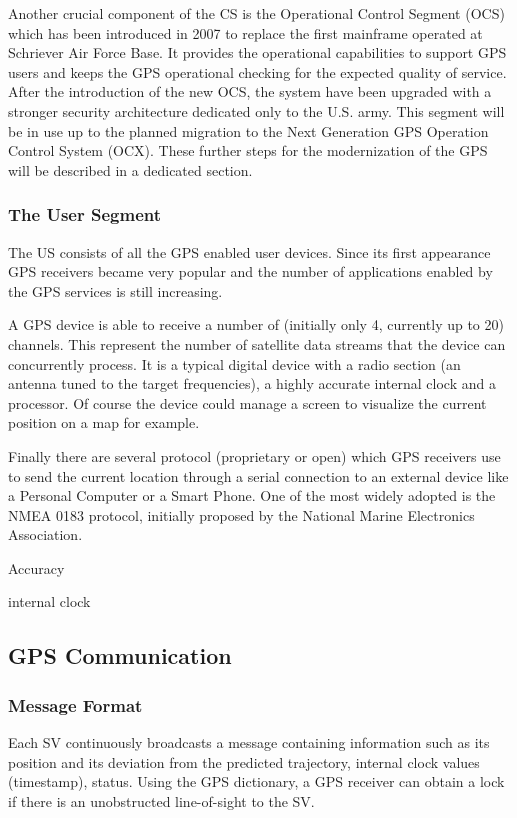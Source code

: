 \documentclass[PhD,binding=0.6cm]{dithesis}
\begin{document}
Another crucial component of the CS is the Operational Control Segment (OCS) which has been introduced in 2007 to replace the first mainframe operated at Schriever Air Force Base. It provides the operational capabilities to support  GPS users and keeps the GPS operational checking for the expected quality of service.
After the introduction of the new OCS, the system have been upgraded with a stronger security architecture dedicated only to the U.S. army. This segment will be in use up to the planned migration to the  Next Generation GPS Operation Control System (OCX). These further steps for the modernization of the GPS will be described in a dedicated section. 

\subsubsection{The User Segment}

The US consists of all the GPS enabled user devices. Since its first appearance GPS receivers became very popular and the number of applications enabled by the GPS services is still increasing.

A GPS device is able to receive a number  of (initially only 4, currently up to 20) channels. This represent the number of satellite data streams that the device can concurrently process. It is a typical digital device with a radio section (an antenna tuned to the target frequencies), a highly accurate internal clock and a processor. Of course the device could manage a screen to visualize the current position on a map for example.

Finally there are several protocol (proprietary or open) which GPS receivers use to send the current location through a serial connection to an external device like a Personal Computer or a Smart Phone. One of the most widely adopted is the NMEA 0183 protocol, initially proposed by the National Marine Electronics Association.

Accuracy

internal clock


\subsection{GPS Communication}

\subsubsection{Message Format}
Each SV continuously broadcasts a message containing information such as its position and its deviation from the predicted trajectory, internal clock values (timestamp), status. Using the GPS dictionary, a GPS receiver can obtain a lock if there is an unobstructed line-of-sight to the SV.
\end{document}
